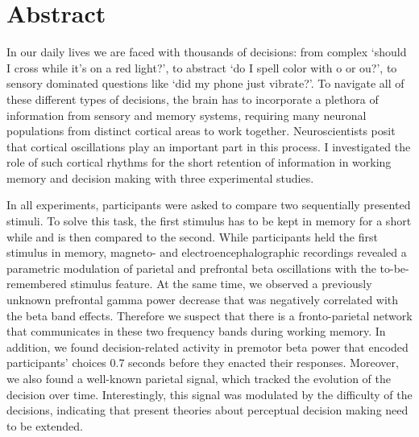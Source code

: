 
\chapter*{Abstract}
In our daily lives we are faced with thousands of decisions: from complex ‘should I cross while it's on a red light?’, to abstract ‘do I spell color with o or ou?’, to sensory dominated questions like ‘did my phone just vibrate?’. To navigate all of these different types of decisions, the brain has to incorporate a plethora of information from sensory and memory systems, requiring many neuronal populations from distinct cortical areas to work together. Neuroscientists posit that cortical oscillations play an important part in this process. I investigated the role of such cortical rhythms for the short retention of information in working memory and decision making with three experimental studies.

In all experiments, participants were asked to compare two sequentially presented stimuli. To solve this task, the first stimulus has to be kept in memory for a short while and is then compared to the second. While participants held the first stimulus in memory, magneto- and electroencephalographic recordings revealed  a parametric modulation of parietal and prefrontal beta oscillations with the to-be-remembered stimulus feature. At the same time, we observed a previously unknown prefrontal gamma power decrease that was negatively correlated with the beta band effects. Therefore we suspect that there is a fronto-parietal network that communicates in these two frequency bands during working memory. In addition, we found decision-related activity in premotor beta power that encoded participants’ choices 0.7 seconds before they enacted their responses. Moreover, we also found a well-known parietal signal, which tracked the evolution of the decision over time. Interestingly, this signal was modulated by the difficulty of the decisions, indicating that present theories about perceptual decision making need to be extended.